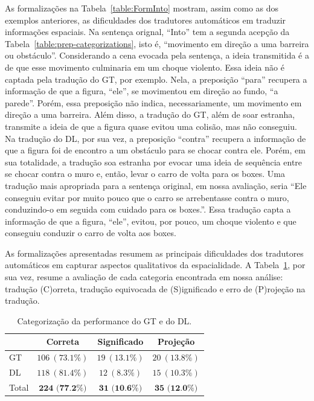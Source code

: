 \documentclass[a4paper, twocolumn, 11pt, twoside]{article}
\begin{document}
As formalizações na Tabela~\ref{table:FormInto} mostram, assim como as dos exemplos anteriores, as dificuldades dos tradutores 
automáticos em traduzir informações espaciais. Na sentença orignal, ``Into'' tem a segunda acepção da Tabela~\ref{table:prep-categorizations}, isto é, 
``movimento em direção a uma barreira ou obstáculo''. Considerando a cena evocada pela sentença, a ideia transmitida é a de que 
esse movimento culminaria em um choque violento. Essa ideia não é captada pela tradução do GT, por exemplo. Nela, a 
preposição ``para'' recupera a informação de que a figura, ``ele'', se movimentou em direção ao fundo, ``a parede''. Porém, essa preposição não indica, necessariamente, um movimento 
em direção a uma barreira. Além disso, a tradução do GT, além de soar estranha, transmite a ideia de que a figura quase evitou uma colisão, mas não conseguiu.
Na tradução do DL, por sua vez, a preposição ``contra'' recupera a informação de que a figura foi de encontro a 
um obstáculo para se chocar contra ele. Porém, em sua totalidade, a tradução soa estranha por evocar uma ideia de sequência entre se chocar contra o muro e, então, levar o carro de volta para os boxes. 
Uma tradução mais apropriada para a sentença original, em nossa avaliação, seria ``Ele conseguiu evitar por muito pouco que o carro se arrebentasse contra o muro, conduzindo-o em seguida com cuidado para os boxes.''. Essa tradução capta a 
informação de que a figura, ``ele'', evitou, por pouco, um choque violento e que conseguiu conduzir o carro de volta aos boxes.


As formalizações apresentadas resumem as principais dificuldades dos tradutores automáticos em capturar aspectos qualitativos da espacialidade.
A Tabela~\ref{table:GT_DL_Errors}, por sua vez, resume a avaliação de cada categoria encontrada em nossa análise: 
tradução (C)orreta, tradução equivocada de (S)ignificado e erro de (P)rojeção na tradução.

\begin{table}[ht]
  \centering
  \footnotesize
  \begin{tabular}{|l|c|c|c|}
  \hline
  & \textbf{Correta} & \textbf{Significado} & \textbf{Projeção} \\
  \hline\hline
  GT & $106~(73.1\%)$ & $19~(13.1\%)$ &  $20~(13.8\%)$\\ \hline
  DL & $118~(81.4\%)$ & $12~(8.3\%)$ &$15~(10.3\%)$ \\ \hline
  Total & $\textbf{224~(77.2\%)}$ & $\textbf{31~(10.6\%)}$ & $\textbf{35~(12.0\%)}$ \\ \hline
  \end{tabular}
  \caption{Categorização da performance do GT e do DL.}
  \label{table:GT_DL_Errors}
  \end{table}
\end{document}
